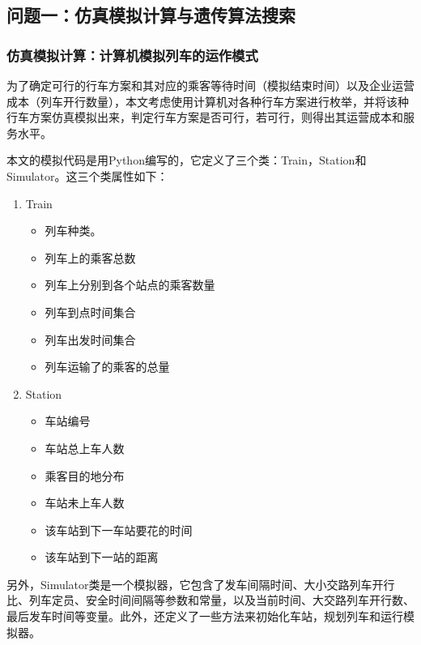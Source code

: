 
\subsection{问题一：仿真模拟计算与遗传算法搜索}

\subsubsection{仿真模拟计算：计算机模拟列车的运作模式}

为了确定可行的行车方案和其对应的乘客等待时间（模拟结束时间）以及企业运营成本（列车开行数量），本文考虑使用计算机对各种行车方案进行枚举，并将该种行车方案仿真模拟出来，判定行车方案是否可行，若可行，则得出其运营成本和服务水平。

本文的模拟代码是用Python编写的，它定义了三个类：Train，Station和\newline
Simulator。这三个类属性如下：

\begin{enumerate}
    \item Train
    \begin{itemize}
        \item 列车种类。
        \item 列车上的乘客总数
        \item 列车上分别到各个站点的乘客数量
        \item 列车到点时间集合
        \item 列车出发时间集合
        \item 列车运输了的乘客的总量
    \end{itemize}

    \item Station
    \begin{itemize}
        \item 车站编号
        \item 车站总上车人数
        \item 乘客目的地分布
        \item 车站未上车人数
        \item 该车站到下一车站要花的时间
        \item 该车站到下一站的距离
    \end{itemize}
\end{enumerate}

另外，Simulator类是一个模拟器，它包含了发车间隔时间、大小交路列车开行比、列车定员、安全时间间隔等参数和常量，以及当前时间、大交路列车开行数、最后发车时间等变量。此外，还定义了一些方法来初始化车站，规划列车和运行模拟器。

